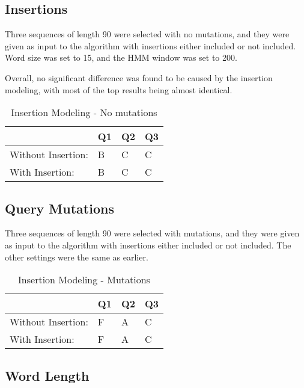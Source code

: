 \documentclass[12pt, conference]{IEEEtran}
\begin{document}
	\subsection{\textbf{Insertions}}
	
	Three sequences of length 90 were selected with no mutations, and they were given as input to the algorithm with insertions either included or not included. Word size was set to 15, and the HMM window was set to 200.
	
	Overall, no significant difference was found to be caused by the insertion modeling, with most of the top results being almost identical.
	
	
	\begin{table}[htbp]
	\centering
	\caption{Insertion Modeling - No mutations}
	\label{my-label}
	\begin{tabular}{|l|l|l|l|}
	\hline
										 & Q1 & Q2 & Q3 \\ \hline
	Without Insertion: & B  & C  & C  \\ \hline
	With Insertion:    & B  & C  & C  \\ \hline
	\end{tabular}
	\end{table}
	
	\subsection{\textbf{Query Mutations}}
	
	Three sequences of length 90 were selected with mutations, and they were given as input to the algorithm with insertions either included or not included. The other settings were the same as earlier.
	
	\begin{table}[htbp]
	\centering
	\caption{Insertion Modeling - Mutations}
	\label{my-label}
	\begin{tabular}{|l|l|l|l|}
	\hline
										 & Q1 & Q2 & Q3 \\ \hline
	Without Insertion: & F  & A  & C  \\ \hline
	With Insertion:    & F  & A  & C  \\ \hline
	\end{tabular}
	\end{table}
	
	\subsection{\textbf{Word Length}}
	
\end{document}
